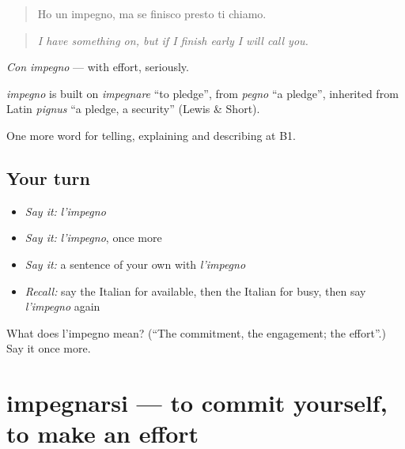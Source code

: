 \begin{quote}
Ho un impegno, ma se finisco presto ti chiamo.
\end{quote}

\begin{quote}
\emph{I have something on, but if I finish early I will call you.}
\end{quote}

\emph{Con impegno} — with effort, seriously.

\begin{cousinweb}
\emph{impegno} is built on \emph{impegnare} \textquotedblleft{}to pledge\textquotedblright{}, from \emph{pegno} \textquotedblleft{}a pledge\textquotedblright{}, inherited from Latin \emph{pignus} \textquotedblleft{}a pledge, a security\textquotedblright{} (Lewis \& Short).
\end{cousinweb}

\begin{grammarlens}[title={What you've built}]
One more word for telling, explaining and describing at B1.
\end{grammarlens}

\subsection*{Your turn}
\begin{itemize}
\raggedright
  \item \emph{Say it:} \emph{l'impegno}
  \item \emph{Say it:} \emph{l'impegno}, once more
  \item \emph{Say it:} a sentence of your own with \emph{l'impegno}
  \item \emph{Recall:} say the Italian for available, then the Italian for busy, then say \emph{l'impegno} again
\end{itemize}

\begin{tcolorbox}[breakable,colback=teal!4,colframe=teal!35!black,title={Before you move on}]
What does l'impegno mean? (\textquotedblleft{}The commitment, the engagement; the effort\textquotedblright{}.) Say it once more.
\end{tcolorbox}
\section[impegnarsi]{impegnarsi — to commit yourself, to make an effort}

\label{lesson:IT-C377-impegnarsi}




